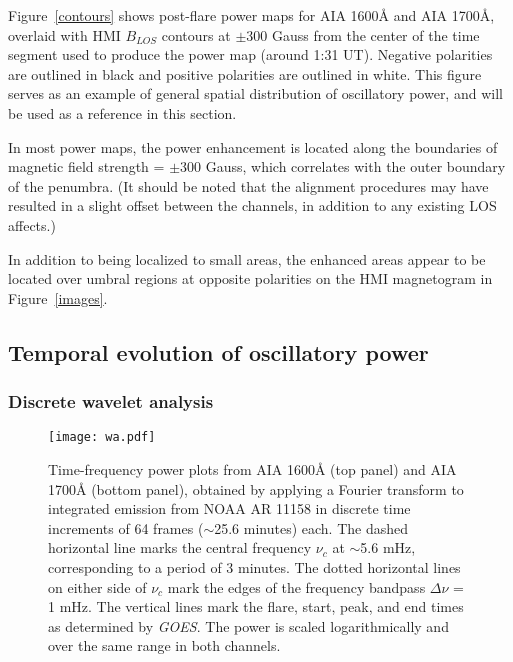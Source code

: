 \myfig Figure~\ref{contours} shows post-flare power maps for
AIA 1600\AA{} and AIA 1700\AA{}, overlaid with
HMI $B_{LOS}$ contours at $\pm$300 Gauss
from the center of the time segment used to produce the power map
(around 1:31 UT).
Negative polarities are outlined in black and
positive polarities are outlined in white.
This figure serves as an example of general spatial distribution
of oscillatory power, and
will be used as a reference in this section.

In most power maps, the power enhancement
is located along the boundaries of magnetic field
strength = $\pm$300 Gauss,
which correlates with the outer boundary of the penumbra.
(It should be noted that the alignment procedures may have resulted in a slight
offset between the channels, in addition to any existing LOS affects.)

In addition to being localized to small areas,
the enhanced areas appear to be located over
umbral regions at opposite polarities on the HMI magnetogram in
\myfig Figure~\ref{images}.

\subsection{Temporal evolution of oscillatory power}\label{time}

\subsubsection{Discrete wavelet analysis}
\begin{figure*}[htb!]\centering
    \texttt{[image: wa.pdf]}
    \caption{
        Time-frequency power plots from AIA 1600\AA{} (top panel) and AIA
        1700\AA{} (bottom panel), obtained by applying a Fourier transform to
        integrated emission from NOAA AR 11158 in discrete time increments of
        64 frames ($\sim$25.6 minutes) each. The dashed horizontal line marks the
        central frequency $\nu_{c}$ at $\sim$5.6 mHz, corresponding to a period
        of 3 minutes. The dotted horizontal lines on either side of $\nu_{c}$
        mark the edges of the frequency bandpass $\Delta\nu$ = 1 mHz. The
        vertical lines mark the flare, start, peak, and end times as determined
        by \textit{GOES}. The power is scaled logarithmically and over the same
        range in both channels.
        \label{wa}}
\end{figure*}

